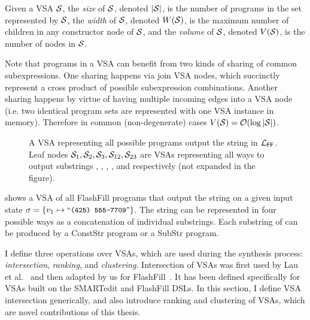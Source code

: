 \begin{defn}
    Given a VSA $\mathcal{S}$, the \emph{size} of $\mathcal{S}$, denoted $|\mathcal{S}|$, is the number of programs in the set
    represented by $\mathcal{S}$, the \emph{width} of $\mathcal{S}$, denoted $W(\mathcal{S})$, is the maximum number of children
    in any constructor node of $\mathcal{S}$, and the \emph{volume} of $\mathcal{S}$, denoted $V(\mathcal{S})$, is the number of nodes in $\mathcal{S}$.
\end{defn}

Note that programs in a VSA can benefit from two kinds of sharing of common subexpressions.
One sharing happens via join VSA nodes, which succinctly represent a cross product of possible subexpression combinations.
Another sharing happens by virtue of having multiple incoming edges into a VSA node (i.e. two identical program sets are represented
with one VSA instance in memory).
Therefore in common (non-degenerate) cases $V(\mathcal{S}) = \mathcal{O}(\log |\mathcal{S}|)$.

\begin{figure}[t]
    \centering
    
    \caption{A VSA representing all possible programs output the string  in $\mathcal{L}_{\mathsf{FF}}$.
    Leaf nodes $\mathcal{S}_1, \mathcal{S}_2, \mathcal{S}_3, \mathcal{S}_{12}, \mathcal{S}_{23}$ are VSAs representing all ways to output substrings
    , , , , and  respectively
    (not expanded in the figure).}
    \label{fig:ex:vsa}
\end{figure}

\begin{example}
     shows a VSA of all FlashFill programs that output the string  on a given input state
    $\state = \left\{ v_1 \mapsto \stringliteral{(425) 555-7709}\right\}$.
    The string  can be represented in four possible ways as a concatenation of individual substrings.
    Each substring of  can be produced by a \textsf{ConstStr} program or a \textsf{SubStr} program.
\end{example}

I define three operations over VSAs, which are used during the synthesis process: \emph{intersection},
\emph{ranking}, and \emph{clustering}.
Intersection of VSAs was first used by Lau et al.~\cite{lau:smartedit} and then adapted by us for FlashFill~\cite{flashfill}.
It has been defined specifically for VSAs built on the SMARTedit and FlashFill DSLs.
In this section, I define VSA intersection generically, and also introduce ranking and clustering of VSAs, which are
novel contributions of this thesis.

